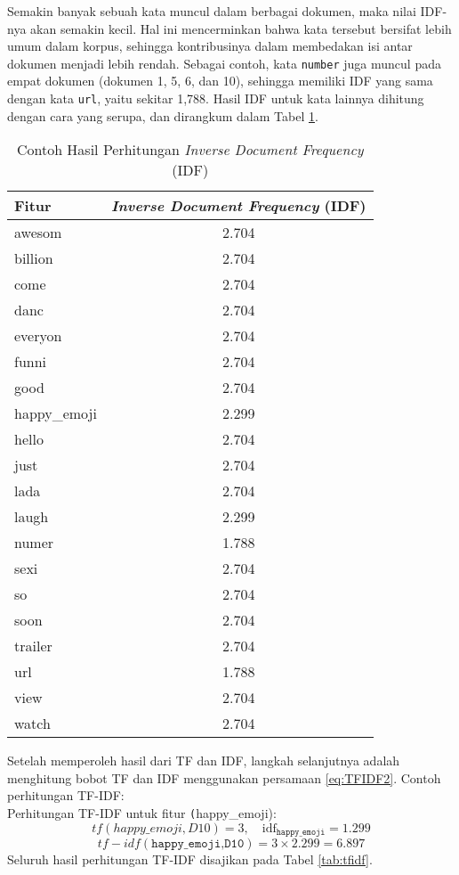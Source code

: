 \documentclass[a4paper,12pt]{report}
\numberwithin{equation}{chapter}
\begin{document}
Semakin banyak sebuah kata muncul dalam berbagai dokumen, maka nilai IDF-nya akan semakin kecil. Hal ini mencerminkan bahwa kata tersebut bersifat lebih umum dalam korpus, sehingga kontribusinya dalam membedakan isi antar dokumen menjadi lebih rendah. Sebagai contoh, kata \texttt{number} juga muncul pada empat dokumen (dokumen 1, 5, 6, dan 10), sehingga memiliki IDF yang sama dengan kata \texttt{url}, yaitu sekitar 1{,}788. Hasil IDF untuk kata lainnya dihitung dengan cara yang serupa, dan dirangkum dalam Tabel \ref{tab:idf}.

\begin{table}[h!]
\centering
\caption{Contoh Hasil Perhitungan \textit{Inverse Document Frequency} (IDF)}
\label{tab:idf}
\begin{tabular}{|l|c|}
\hline
\textbf{Fitur} & \textbf{\textit{Inverse Document Frequency} (IDF)} \\ \hline
awesom     & 2.704 \\ \hline
billion  & 2.704 \\ \hline
come       & 2.704 \\ \hline
danc    & 2.704 \\ \hline
everyon     & 2.704 \\ \hline
funni    & 2.704 \\ \hline
good  & 2.704 \\ \hline
happy\_emoji  & 2.299 \\ \hline
hello   & 2.704 \\ \hline
just   & 2.704 \\ \hline
lada     & 2.704 \\ \hline
laugh      & 2.299 \\ \hline
numer     & 1.788 \\ \hline
sexi    & 2.704 \\ \hline
so    & 2.704 \\ \hline
soon    & 2.704 \\ \hline
trailer    & 2.704 \\ \hline
url      & 1.788 \\ \hline
view     & 2.704 \\ \hline
watch    & 2.704 \\ \hline
\end{tabular}
\end{table}

Setelah memperoleh hasil dari TF dan IDF, langkah selanjutnya adalah menghitung bobot TF dan IDF menggunakan persamaan \ref{eq:TFIDF2}. Contoh perhitungan TF-IDF: \\
Perhitungan TF-IDF untuk fitur \texttt(happy\_emoji):
\[
        tf(happy\_emoji, D10) = 3, \quad \text{idf}_{\texttt{happy\_emoji}} = 1.299
        \]
        \[
        tf-idf(\texttt{happy\_emoji,D10})
        = 3 \times 2{.}299 =  6{.}897
        \]
Seluruh hasil perhitungan TF-IDF disajikan pada Tabel \ref{tab:tfidf}.
\end{document}
